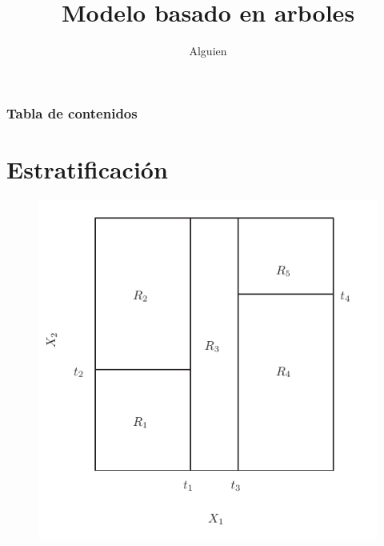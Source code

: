 \documentclass{beamer}
\title{Modelo basado en arboles}
\author{Alguien}
\institute{Universidad de Sevilla}
\date{}
\theoremstyle{definition}
\begin{document}
\frame{\titlepage}
%
%
% 
% 
% 
% 



\begin{frame}
\frametitle{Tabla de contenidos}
\tableofcontents
\end{frame}

\section{Estratificación}

\begin{frame}
\begin{figure}[h!]
\includegraphics[scale=0.4]{regiones}
\end{figure}
\end{frame}
\end{document}
